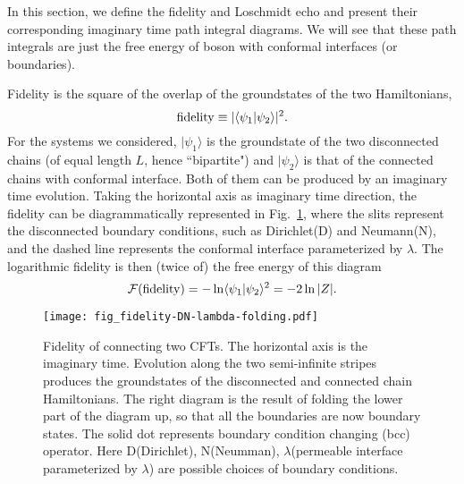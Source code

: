 
In this section, we define the fidelity and Loschmidt echo and present their corresponding imaginary time path integral diagrams.  We will see that these path integrals are just the free energy of boson with conformal interfaces (or boundaries). 

Fidelity is the square of the overlap of the groundstates of the two Hamiltonians, 
\begin{equation}
{\rm fidelity} \equiv |\langle \psi_1 |\psi_2  \rangle |^2 .
\end{equation}
For the systems we considered, $|\psi_1 \rangle$ is the groundstate of the two disconnected chains (of equal length $L$, hence ``bipartite") and $|\psi_2\rangle$ is that of the connected chains with conformal interface. Both of them can be produced by an imaginary time evolution. Taking the horizontal axis as imaginary time direction, the fidelity can be diagrammatically represented in Fig.~\ref{fig:fidel}, where the slits represent the disconnected boundary conditions, such as Dirichlet(D) and Neumann(N), and the dashed line represents the conformal interface parameterized by $\lambda$. The logarithmic fidelity is then (twice of) the free energy of this diagram
\begin{equation}
\mathcal{F}( {\rm fidelity} )  = - \ln \langle \psi_1 |\psi_2 \rangle^2 = - 2 \ln |Z|.
\end{equation}

\begin{figure}[h]
\texttt{[image: fig\_fidelity-DN-lambda-folding.pdf]}
\caption{Fidelity of connecting two CFTs. The horizontal axis is the imaginary time. Evolution along the two semi-infinite stripes produces the groundstates of the disconnected and connected chain Hamiltonians. The right diagram is the result of folding the lower part of the diagram up, so that all the boundaries are now boundary states. The solid dot represents boundary condition changing (bcc) operator. Here D(Dirichlet), N(Neumman), $\lambda$(permeable interface parameterized by $\lambda$) are possible choices of boundary conditions.}
\label{fig:fidel}
\end{figure}

